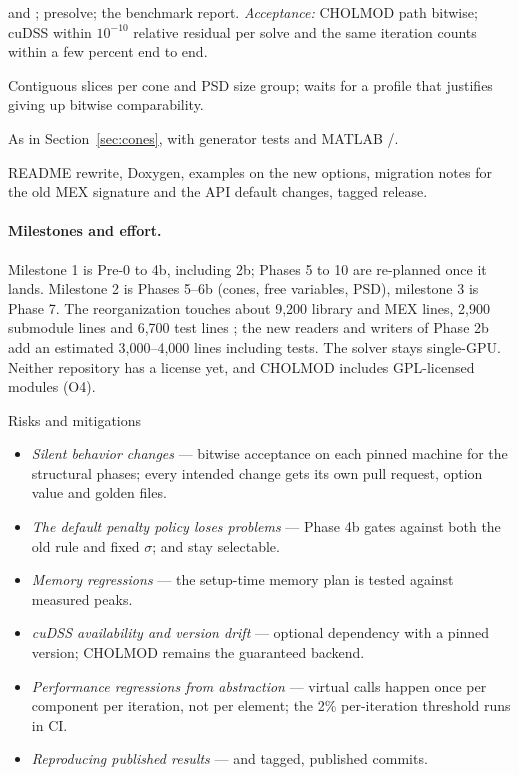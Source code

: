 \documentclass[11pt]{article}
\begin{document}
\begin{description}[style=nextline,leftmargin=0.6cm]
 and ; presolve; the benchmark report. \emph{Acceptance:} CHOLMOD path bitwise; cuDSS within $10^{-10}$ relative residual per solve
and the same iteration counts within a few percent end to end.
\item[Phase 8 --- Data layout (deferred).] Contiguous slices per cone and PSD size group; waits for a profile
that justifies giving up bitwise comparability.
\item[Phase 9 --- Second-order cones (deferred until needed).] As in Section~\ref{sec:cones}, with generator
tests and MATLAB /.
\item[Phase 10 --- Documentation and release.] README rewrite, Doxygen, examples on the new options, migration
notes for the old MEX signature and the API default changes, tagged release.
\end{description}

\paragraph{Milestones and effort.} Milestone 1 is Pre-0 to 4b, including 2b; Phases 5 to 10 are re-planned once
it lands. Milestone 2 is Phases 5--6b (cones, free variables, PSD), milestone 3 is Phase 7. The reorganization
touches about 9{,}200 library and MEX lines, 2{,}900 submodule lines and 6{,}700 test lines \cite{review20}; the
new readers and writers of Phase 2b add an estimated 3{,}000--4{,}000 lines including tests. The solver
stays single-GPU. Neither repository has a license yet, and CHOLMOD includes GPL-licensed modules (O4).

\begin{warnbox}{Risks and mitigations}
\begin{itemize}[leftmargin=*]
  \item \emph{Silent behavior changes} --- bitwise acceptance on each pinned machine for the structural phases;
  every intended change gets its own pull request, option value and golden files.
  \item \emph{The default penalty policy loses problems} --- Phase 4b gates against both the old rule and fixed
  $\sigma$;  and  stay selectable.
  \item \emph{Memory regressions} --- the setup-time memory plan is tested against measured peaks.
  \item \emph{cuDSS availability and version drift} --- optional dependency with a pinned version; CHOLMOD
  remains the guaranteed backend.
  \item \emph{Performance regressions from abstraction} --- virtual calls happen once per component per
  iteration, not per element; the 2\% per-iteration threshold runs in CI.
  \item \emph{Reproducing published results} ---  and tagged, published commits.
\end{itemize}
\end{warnbox}
\end{document}
